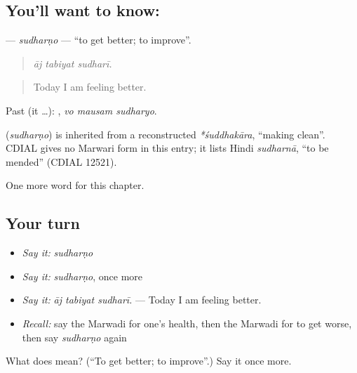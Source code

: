 \subsection*{You'll want to know: }
\textbf{} — \emph{sudharṇo} — \textquotedblleft{}to get better; to improve\textquotedblright{}.

\begin{quote}
  
\end{quote}

\begin{quote}
\emph{āj tabiyat sudharī.}
\end{quote}

\begin{quote}
Today I am feeling better.
\end{quote}

Past (it …):   , \emph{vo mausam sudharyo}.

\begin{cousinweb}
\textbf{} (\emph{sudharṇo}) is inherited from a reconstructed \emph{*śuddhakāra}, \textquotedblleft{}making clean\textquotedblright{}. CDIAL gives no Marwari form in this entry; it lists Hindi \emph{sudharnā}, \textquotedblleft{}to be mended\textquotedblright{} (CDIAL 12521).
\end{cousinweb}

\begin{grammarlens}[title={What you've built}]
One more word for this chapter.
\end{grammarlens}

\subsection*{Your turn}
\begin{itemize}
\raggedright
  \item \emph{Say it:} \emph{sudharṇo}
  \item \emph{Say it:} \emph{sudharṇo}, once more
  \item \emph{Say it:} \emph{āj tabiyat sudharī.} — Today I am feeling better.
  \item \emph{Recall:} say the Marwadi for one's health, then the Marwadi for to get worse, then say \emph{sudharṇo} again
\end{itemize}

\begin{tcolorbox}[breakable,colback=teal!4,colframe=teal!35!black,title={Before you move on}]
What does  mean? (\textquotedblleft{}To get better; to improve\textquotedblright{}.) Say it once more.
\end{tcolorbox}
